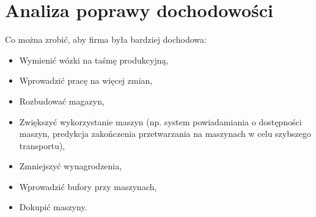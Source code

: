 \documentclass[a4paper]{article}
\begin{document}
\section{Analiza poprawy dochodowości}
Co można zrobić, aby firma była bardziej dochodowa:
\begin{itemize}
\item Wymienić wózki na taśmę produkcyjną,
\item Wprowadzić pracę na więcej zmian,
\item Rozbudować magazyn,
\item Zwiększyć wykorzystanie maszyn (np. system powiadamiania o dostępności maszyn, predykcja zakończenia przetwarzania na maszynach w celu szybszego transportu),
\item Zmniejszyć wynagrodzenia,
\item Wprowadzić bufory przy maszynach,
\item Dokupić maszyny.
\end{itemize}
\end{document}
